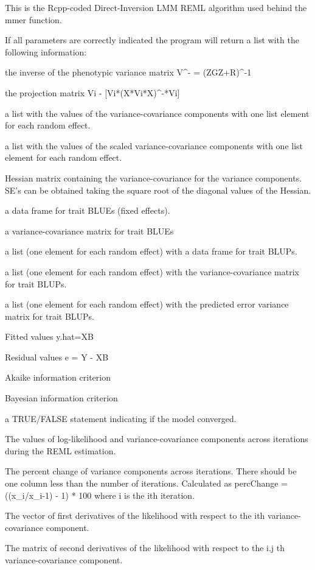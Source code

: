 \documentclass[a4paper]{book}
\begin{document}
%
\begin{Details}\relax

This is the Rcpp-coded Direct-Inversion LMM REML algorithm used behind the mmer function.

\end{Details}
%
\begin{Value}
If all parameters are correctly indicated the program will return a list with the following information:

\begin{ldescription}
\item[\code{Vi}] the inverse of the phenotypic variance matrix V\textasciicircum{}- = (ZGZ+R)\textasciicircum{}-1
\item[\code{P}] the projection matrix  Vi - [Vi*(X*Vi*X)\textasciicircum{}-*Vi] 
\item[\code{sigma}] a list with the values of the variance-covariance components with one list element for each random effect.
\item[\code{sigma\_scaled}] a list with the values of the scaled variance-covariance components with one list element for each random effect.
\item[\code{sigmaSE}] Hessian matrix containing the variance-covariance for the variance components. SE's can be obtained taking the square root of the diagonal values of the Hessian.
\item[\code{Beta}] a data frame for trait BLUEs (fixed effects).
\item[\code{VarBeta}] a variance-covariance matrix for trait BLUEs
\item[\code{U}] a list (one element for each random effect) with a data frame for trait BLUPs.
\item[\code{VarU}] a list (one element for each random effect) with the variance-covariance matrix for trait BLUPs.
\item[\code{PevU}] a list (one element for each random effect) with the predicted error variance matrix for trait BLUPs.
\item[\code{fitted}]  Fitted values y.hat=XB
\item[\code{residuals}] Residual values e = Y - XB
\item[\code{AIC}] Akaike information criterion
\item[\code{BIC}] Bayesian information criterion
\item[\code{convergence}] a TRUE/FALSE statement indicating if the model converged.
\item[\code{monitor}] The values of log-likelihood and variance-covariance components across iterations during the REML estimation.
\item[\code{percChange}] The percent change of variance components across iterations. There should be one column less than the number of iterations. Calculated as percChange = ((x\_i/x\_i-1) - 1) * 100 where i is the ith iteration.
\item[\code{dL}] The vector of first derivatives of the likelihood with respect to the ith variance-covariance component.
\item[\code{dL2}] The matrix of second derivatives of the likelihood with respect to the i.j th variance-covariance component.


\end{ldescription}
\end{Value}
\end{document}
